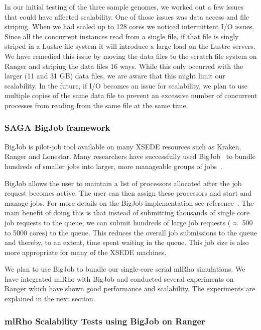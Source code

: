 \documentclass{sig-alternate}
\begin{document}
In our initial testing of the three sample genomes, we worked out a few issues that could have affected
scalability. One of those issues was data access and file striping. When we had scaled up to 128 cores we
noticed intermittent I/O issues. Since all the concurrent instances read from a single file, if that file is
singly striped in a Lustre file system it will introduce a large load on the Lustre servers. We have remedied
this issue by moving the data files to the scratch file system on Ranger and striping the data files 16
ways. While this only occurred with the larger (11 and 31 GB) data files, we are aware that this might limit
our scalability. In the future, if I/O becomes an issue for scalability, we plan to use multiple copies of the
same data file to prevent an excessive number of concurrent processes from reading from the same file at the same time.

\subsubsection{SAGA BigJob framework}
\label{sec:bigjob}

BigJob is pilot-job tool available on many XSEDE resources such as Kraken, Ranger and Lonestar. Many researchers have successfully used BigJob~\cite{bigjob_web} to bundle hundreds of smaller jobs into larger, more manageable groups of jobs~\cite{Luckow:2008fp, async_repex11}. 

BigJob allows the user to maintain a list of processors allocated after the job request becomes active. The user can then assign these processors and start and manage jobs. For more details on the BigJob implementation see reference~\cite{saga_bigjob_condor_cloud}. The main benefit of doing this is that instead of submitting thousands of single core job requests to the queue, we can submit hundreds of large job requests ($\approx$ 500 to 5000 cores) to the queue. This reduces the overall job submissions to the queue and thereby, to an extent, time spent waiting in the queue. This job size is also more appropriate for many of the XSEDE machines. 

We plan to use BigJob to bundle our single-core serial mlRho simulations. We have integrated mlRho with BigJob and conducted several experiments on Ranger which have shown good performance and scalability. The experiments are explained in the next section. 


\subsubsection{mlRho Scalability Tests using BigJob on Ranger }
\label{sec:tests}
\end{document}

